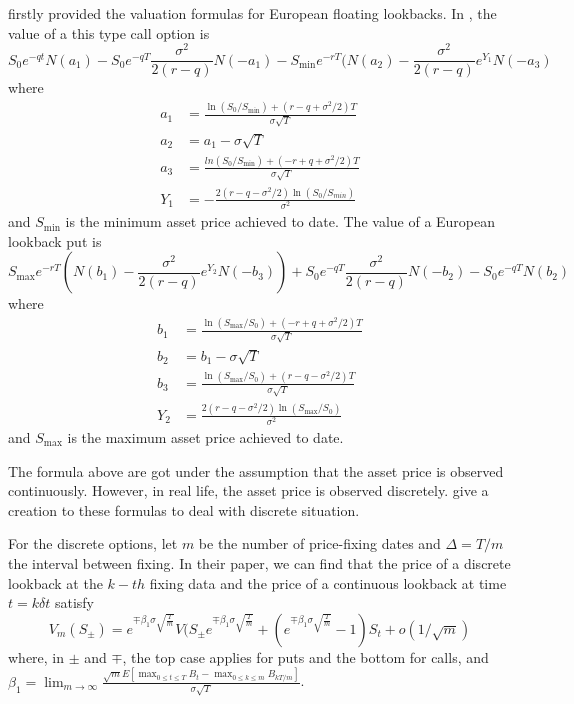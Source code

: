 \documentclass[11pt]{book}
\begin{document}
\cite{Goldman1979} firstly provided the valuation formulas for European floating lookbacks. In \cite{Hull2008}, the value of a this type call option is
\begin{equation}\label{eq:3}
S_0e^{-qt}N(a_1) - S_0 e^{-qT}\frac{\sigma ^2}{2(r-q)} N(-a_1) - S_{\min} e^{-rT}(N(a_2) - \frac{\sigma^2}{2(r-q)} e ^{Y_1} N(-a_3)
\end{equation}
where
\begin{equation}\label{eq:4}
\begin{split}
a_1 &=\frac{\ln(S_0 / S_{\min}) + (r-q+\sigma^2 /2)T}{\sigma \sqrt{T}}\\
a_2 &= a_1 - \sigma \sqrt{T}\\
a_3 &= \frac{ln(S_0 / S_{\min})+ (-r+q+\sigma^2 / 2)T}{\sigma \sqrt{T}}\\
Y_1 &= - \frac{2(r-q-\sigma^2 / 2) \ln(S_0 / S_{min})}{\sigma^2}
\end{split}
\end{equation}
and $S_{\min}$ is the minimum asset price achieved to date.
The value of a European lookback put is
\begin{equation}\label{eq:5}
S_{\max} e^{-rT} ( N(b_1) - \frac{\sigma^2}{2(r-q)} e^{Y_2} N(-b_3)) + S_0 e^{-qT}\frac{\sigma^2}{2(r-q)} N(-b_2) - S_0 e^{-qT} N(b_2)
\end{equation}
where
\begin{equation}\label{eq:6}
\begin{split}
b_1 &= \frac{\ln(S_{\max} / S_0) + (-r + q + \sigma^2 /2)T}{\sigma \sqrt{T}}\\
b_2 &= b_1 - \sigma \sqrt{T}\\
b_3 &= \frac{\ln(S_{\max} / S_0) + (r-q-\sigma^2 /2)T}{\sigma \sqrt{T}}\\
Y_2 &= \frac{2(r-q-\sigma^2 / 2) \ln(S_{\max} / S_0)}{\sigma^2}
\end{split}
\end{equation}
and $S_{\max}$ is the maximum asset price achieved to date.



The formula above are got under the assumption that the asset price is observed continuously. However, in real life, the asset price is observed discretely. \cite{Broadie1999} give a creation to these formulas to deal with discrete situation.

For the discrete options, let $m$ be the number of price-fixing dates and $\Delta = T/m$ the interval between fixing. In their paper, we can find that the price of a discrete lookback at the $k-th$ fixing data and the price of a continuous lookback at time $t = k \delta t$ satisfy
\begin{equation}\label{eq:7}
V_m (S_\pm)
=
e^{\mp\beta_1 \sigma \sqrt{\frac{T}{m}}}
V(S_{\pm}e^{\mp\beta _1 \sigma \sqrt{\frac{T}{m}}} +
(e^{\mp \beta_1 \sigma \sqrt{\frac{T}{m}}} -1)S_t + o(1/\sqrt{m})
\end{equation}
where, in $\pm$ and $\mp$, the top case applies for puts and the bottom for calls, and $\beta_1 = \lim_{m\to\infty} \frac{\sqrt{m}E[\max_{0\leq t \leq T} B_t - \max_{0\leq k \leq m} B_{kT/m}]}{\sigma \sqrt{T}}$.
\end{document}

